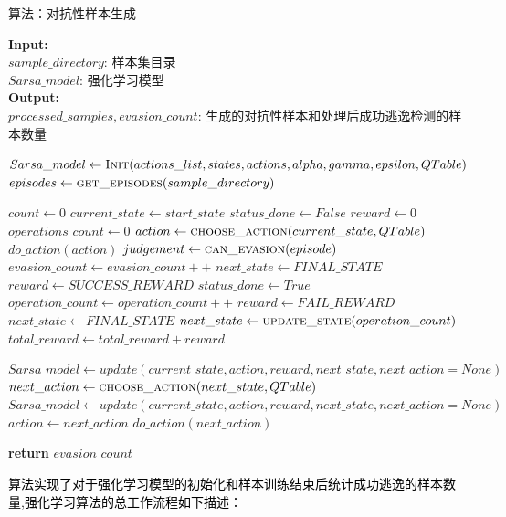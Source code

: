 \begin{algorithm}
	\caption{算法：对抗性样本生成}
	\label{alg1}
	\textbf{Input:} \\
	\hspace*{1cm} $sample\_directory$: 样本集目录 \\
	\hspace*{1cm} $Sarsa\_model$: 强化学习模型 \\
	\textbf{Output:} \\
	\hspace*{1cm} $processed\_samples,evasion\_count$: 生成的对抗性样本和处理后成功逃逸检测的样本数量
	\begin{algorithmic}[1]
            \State $Sarsa\_model \gets \Call{Init}{actions\_list,states,actions, alpha,gamma,epsilon,QTable}$
            \State $episodes \gets \Call{get\_episodes}{sample\_directory}$

      	\State $count \gets 0$
            \State $current\_state \gets start\_state$
            \State $status\_done \gets False$
            \State $reward \gets 0$
            \State $operations\_count \gets 0$
            \State $action \gets \Call{choose\_action}{current\_state,QTable}$
            \State $do\_action(action)$
            \State $judgement \gets \Call{can\_evasion}{episode}$
            \State $evasion\_count \gets evasion\_count++$
            \State $next\_state \gets FINAL\_STATE$
            \State $reward \gets SUCCESS\_REWARD$
            \State $status\_done \gets True$
            \Else
            \State $operation\_count \gets operation\_count++$
            \State $reward \gets FAIL\_REWARD$
            \State $next\_state \gets FINAL\_STATE$
            \Else
            \State $next\_state \gets \Call{update\_state}{operation\_count}$
            \EndIf
            \EndIf
            \State $total\_reward \gets total\_reward+reward$

            \State $Sarsa\_model \gets update(current\_state,action,reward,next\_state,next\_action=None)$
            \Else
            \State $next\_action \gets \Call{choose\_action}{next\_state,QTable}$
            \State $Sarsa\_model \gets update(current\_state,action,reward,next\_state,next\_action=None)$
            \State $action \gets next\_action$
            \State $do\_action(next\_action)$
            \EndIf
            
            \EndWhile
     	\EndFor       
            \State \textbf{return} $evasion\_count$
		\EndFunction
	\end{algorithmic}
\end{algorithm}
\textcolor{black}{算法实现了对于强化学习模型的初始化和样本训练结束后统计成功逃逸的样本数量,强化学习算法的总工作流程如下描述：}

